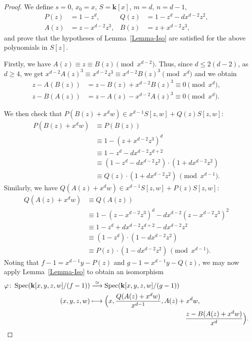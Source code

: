 \documentclass[JEP,XML,SOM,Unicode,NoFloatCountersInSection,published]{cedram}
\newcommand\mto{\mathchoice{\longmapsto}{\mapsto}{\mapsto}{\mapsto}}
\theoremstyle{definition}
\newcommand\iso{\stackrel{\simeq}{\longrightarrow}}
\renewcommand\k{{\mathbf k}}
\newcommand{\kk}{\mathbf{k}}
\DeclareMathOperator{\Spec}{Spec}
\begin{document}
\begin{proof}
We define $s=0$, $x_0=x$, $S=\kk[x]$, $m=d$, $n=d-1$,
\begin{align*}
P(z)&=1-z^{d}, & Q(z) &=1-z^{d}-dx^{d-2}z^2, \\
A(z)&=z-x^{d-2}z^3, & B(z) &=z+x^{d-2}z^3,
\end{align*}
and prove that the hypotheses of Lemma~\ref{Lemma-Iso} are satisfied for the above polynomials in $S[z]$.

Firstly, we have $A(z)\equiv z\equiv B(z) \pmod{x^{d-2}}$. Thus, since $d\le 2(d-2)$, as $d\ge 4$, we get $x^{d-2}A(z)^3\equiv x^{d-2}z^3\equiv x^{d-2} B(z)^3 \pmod{x^d}$ and we obtain
\begin{align*}
z-A(B(z))&= z-B(z)+x^{d-2}B(z)^3\equiv 0\pmod{x^d}, \\
z-B(A(z))&= z-A(z)-x^{d-2}A(z)^3\equiv 0\pmod{x^d}.
\end{align*}

We then check that $P\left(B(z)+x^{d}w\right)\in x^{d-1}S[z,w]+Q(z)S[z,w]$:
\begin{align*}
P(B(z)+x^{d}w) &\equiv P(B(z)) \\
&\equiv 1 -(z+x^{d-2}z^3)^{d} \\
&\equiv 1-z^{d}-dx^{d-2}z^{d+2}\\
&\equiv (1-z^{d}-dx^{d-2}z^2)\cdot (1+dx^{d-2}z^2)\\
&\equiv Q(z) \cdot (1+dx^{d-2}z^2)\, \pmod{x^{d-1}}.
\end{align*}
Similarly, we have
$Q(A(z)+x^{d}w)\in x^{d-1}S[z,w]+P(z)S[z,w]$:
\begin{align*}
Q(A(z)+x^{d}w) &\equiv Q\left(A(z)\right)\\
& \equiv 1-(z-x^{d-2}z^3)^{d}-dx^{d-2}(z-x^{d-2}z^3)^2 \\
&\equiv 1 -z^{d}+dx^{d-2}z^{d+2}-dx^{d-2}z^2\\
&\equiv (1-z^{d})\cdot (1-dx^{d-2}z^2)\\
&\equiv P(z) \cdot (1-dx^{d-2}z^2)\, \pmod{x^{d-1}}.
\end{align*}
Noting that $f-1=x^{d-1}y-P(z)$ and $g-1=x^{d-1}y-Q(z)$, we may now apply Lemma~\ref{Lemma-Iso} to obtain an isomorphism
\begin{align*}
\varphi\colon\Spec(\k[x,y,z,w]/(f-1)) & \iso \Spec(\k[x,y,z,w]/(g-1)) \\
(x,y,z,w) & \mto \Bigl(x,\frac{Q(A(z)+x^{d}w)}{x^{d-1}},
A(z)+x^{d}w,\\
&\hspace*{5cm}\frac{z-B(A(z)+x^{d}w)}{x^{d}}\Bigr).
\end{align*}


\end{proof}
\end{document}
